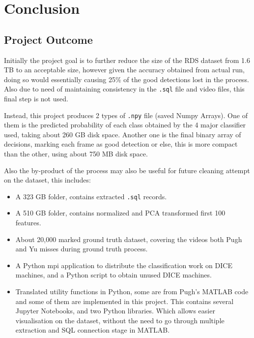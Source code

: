 \documentclass[bsc,logo,twoside,fullspacing,parskip]{infthesis}
\begin{document}
\newpage

\chapter{Conclusion}
\label{chap:conclusion}

\section{Project Outcome}

Initially the project goal is to further reduce the size of the RDS dataset from 1.6 TB to an acceptable size, however given the accuracy obtained from actual run, doing so would essentially causing 25\% of the good detections lost in the process. Also due to need of maintaining consistency in the {\tt .sql} file and video files, this final step is not used.

Instead, this project produces 2 types of {\tt .npy} file (saved Numpy Arrays). 
One of them is the predicted probability of each class obtained by the 4 major classifier used, taking about 260 GB disk space. 
Another one is the final binary array of decisions, marking each frame as good detection or else, this is more compact than the other, using about 750 MB disk space.

Also the by-product of the process may also be useful for future cleaning attempt on the dataset, this includes:
\begin{itemize}
\item A 323 GB folder, contains extracted {\tt .sql} records.
\item A 510 GB folder, contains normalized and PCA transformed first 100 features.
\item About 20,000 marked ground truth dataset, covering the videos both Pugh and Yu misses during ground truth process.
\item A Python mpi application to distribute the classification work on DICE machines, and a Python script to obtain unused DICE machines.
\item Translated utility functions in Python, some are from Pugh's MATLAB code and some of them are implemented in this project. This contains several Jupyter Notebooks, and two Python libraries. Which allows easier visualisation on the dataset, without the need to go through multiple extraction and SQL connection stage in MATLAB. 
\end{itemize}

\end{document}
